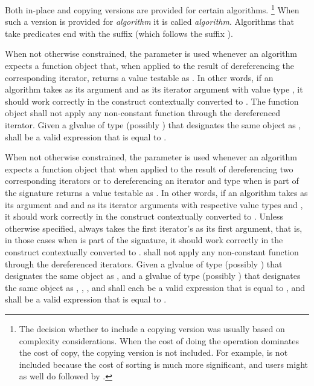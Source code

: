\pnum
Both in-place and copying versions are provided for certain algorithms.%
\footnote{The decision whether to include a copying version was
usually based on complexity considerations.
When the cost of doing the operation dominates the cost of copy,
the copying version is not included.
For example,  is not included
because the cost of sorting is much more significant,
and users might as well do  followed by .}
When such a version is provided for \textit{algorithm} it is called
\textit{algorithm}.
Algorithms that take predicates end with the suffix 
(which follows the suffix ).

\pnum
When not otherwise constrained, the  parameter is used
whenever an algorithm expects a function object that,
when applied to the result of dereferencing the corresponding iterator,
returns a value testable as .
In other words,
if an algorithm takes  as its argument and
 as its iterator argument with value type ,
it should work correctly in the construct
 contextually converted to .
The function object  shall not apply any non-constant function
through the dereferenced iterator.
Given a glvalue  of type (possibly ) 
that designates the same object as ,
 shall be a valid expression
that is equal to .

\pnum
When not otherwise constrained, the  parameter is used
whenever an algorithm expects a function object that when applied
to the result of dereferencing two corresponding iterators or
to dereferencing an iterator and type 
when  is part of the signature
returns a value testable as .
In other words,
if an algorithm takes  as its argument and
 and  as its iterator arguments
with respective value types  and ,
it should work correctly in the construct
 contextually converted to .
Unless otherwise specified,
 always takes the first iterator's 
as its first argument, that is, in those cases when 
is part of the signature, it should work correctly in the construct
 contextually converted to .
 shall not apply any non-constant function
through the dereferenced iterators.
Given a glvalue  of type (possibly ) 
that designates the same object as , and
a glvalue  of type (possibly ) 
that designates the same object as ,
,
, and
shall each be a valid expression that is equal to
, and
shall be a valid expression that is equal to
.

